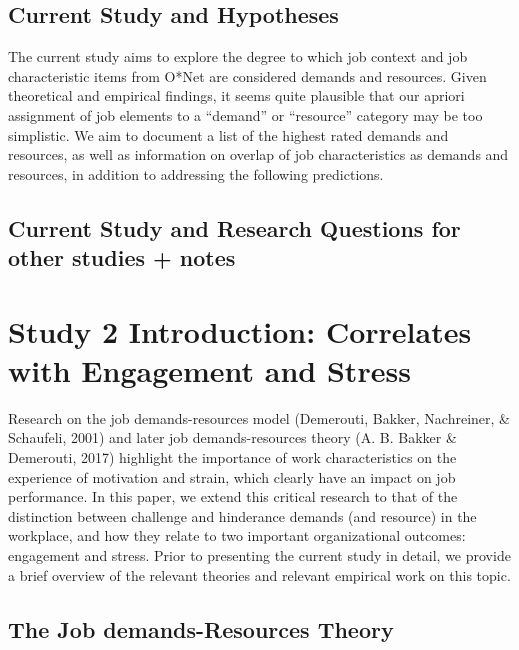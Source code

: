 \documentclass[
  english,
  man]{apa6}
\begin{document}
\hypertarget{current-study-and-hypotheses}{%
\subsection{Current Study and Hypotheses}\label{current-study-and-hypotheses}}

The current study aims to explore the degree to which job context and job characteristic items from O*Net are considered demands and resources. Given theoretical and empirical findings, it seems quite plausible that our apriori assignment of job elements to a ``demand'' or ``resource'' category may be too simplistic. We aim to document a list of the highest rated demands and resources, as well as information on overlap of job characteristics as demands and resources, in addition to addressing the following predictions.

\hypertarget{current-study-and-research-questions-for-other-studies-notes}{%
\subsection{Current Study and Research Questions for other studies + notes}\label{current-study-and-research-questions-for-other-studies-notes}}

\hypertarget{study-2-introduction-correlates-with-engagement-and-stress}{%
\section{Study 2 Introduction: Correlates with Engagement and Stress}\label{study-2-introduction-correlates-with-engagement-and-stress}}

Research on the job demands-resources model (Demerouti, Bakker, Nachreiner, \& Schaufeli, 2001) and later job demands-resources theory (A. B. Bakker \& Demerouti, 2017) highlight the importance of work characteristics on the experience of motivation and strain, which clearly have an impact on job performance. In this paper, we extend this critical research to that of the distinction between challenge and hinderance demands (and resource) in the workplace, and how they relate to two important organizational outcomes: engagement and stress. Prior to presenting the current study in detail, we provide a brief overview of the relevant theories and relevant empirical work on this topic.

\hypertarget{the-job-demands-resources-theory-1}{%
\subsection{The Job demands-Resources Theory}\label{the-job-demands-resources-theory-1}}
\end{document}
